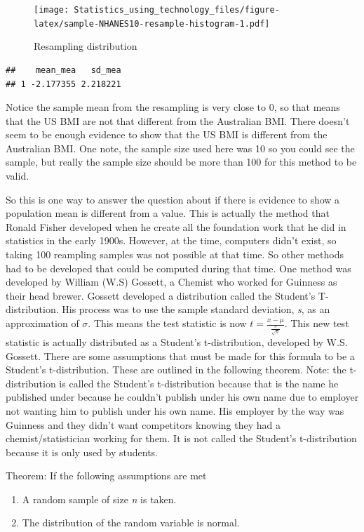 \documentclass[
]{book}
\begin{document}
\begin{figure}
\centering
\texttt{[image: Statistics\_using\_technology\_files/figure-latex/sample-NHANES10-resample-histogram-1.pdf]}
\caption{\label{fig:sample-NHANES10-resample-histogram}Resampling distribution}
\end{figure}

\begin{verbatim}
##    mean_mea   sd_mea
## 1 -2.177355 2.218221
\end{verbatim}

Notice the sample mean from the resampling is very close to 0, so that means that the US BMI are not that different from the Australian BMI. There doesn't seem to be enough evidence to show that the US BMI is different from the Australian BMI. One note, the sample size used here was 10 so you could see the sample, but really the sample size should be more than 100 for this method to be valid.

So this is one way to answer the question about if there is evidence to show a population mean is different from a value. This is actually the method that Ronald Fisher developed when he create all the foundation work that he did in statistics in the early 1900s. However, at the time, computers didn't exist, so taking 100 reampling samples was not possible at that time. So other methods had to be developed that could be computed during that time. One method was developed by William (W.S) Gossett, a Chemist who worked for Guinness as their head brewer. Gossett developed a distribution called the Student's T-distribution. His process was to use the sample standard deviation, \emph{s}, as an approximation of \(\sigma\). This means the test statistic is now \(t=\frac{x-\mu}{\frac{s}{\sqrt{n}}}\). This new test statistic is actually distributed as a Student's t-distribution, developed by W.S. Gossett. There are some assumptions that must be made for this formula to be a Student's t-distribution. These are outlined in the following theorem. Note: the t-distribution is called the Student's t-distribution because that is the name he published under because he couldn't publish under his own name due to employer not wanting him to publish under his own name. His employer by the way was Guinness and they didn't want competitors knowing they had a chemist/statistician working for them. It is not called the Student's t-distribution because it is only used by students.

Theorem: If the following assumptions are met

\begin{enumerate}
\def\labelenumi{\alph{enumi}.}
\item
  A random sample of size \emph{n} is taken.
\item
  The distribution of the random variable is normal.
\end{enumerate}
\end{document}
